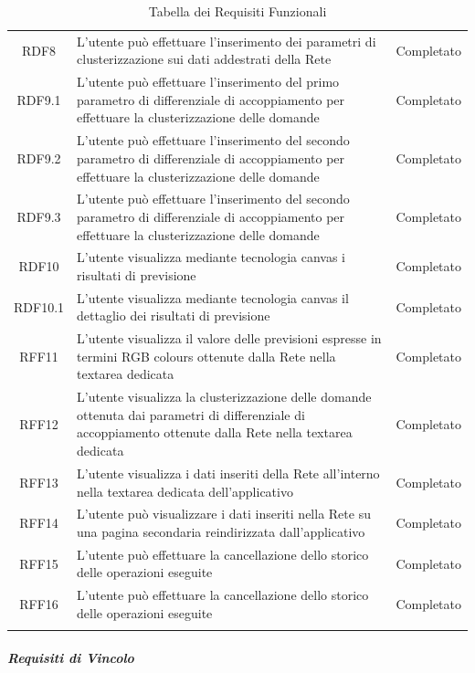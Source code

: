 \begin{longtable}{|c|p{7cm}|c|}
    RDF8 & L'utente pu\`o effettuare l'inserimento dei parametri di clusterizzazione sui dati addestrati della Rete & Completato \\
    RDF9.1 & L'utente pu\`o effettuare l'inserimento del primo parametro di differenziale di accoppiamento per effettuare la clusterizzazione delle domande  & Completato \\
   RDF9.2 & L'utente pu\`o effettuare l'inserimento del secondo parametro di differenziale di accoppiamento per effettuare la clusterizzazione delle domande  & Completato \\
		RDF9.3 & L'utente pu\`o effettuare l'inserimento del secondo parametro di differenziale di accoppiamento per effettuare la clusterizzazione delle domande  & Completato \\
    \hline 
    RDF10 & L'utente visualizza mediante tecnologia canvas i risultati di previsione & Completato \\
    RDF10.1 & L'utente visualizza mediante tecnologia canvas il dettaglio dei risultati di previsione & Completato \\
    \hline
    RFF11 & L'utente visualizza il valore delle previsioni espresse in termini RGB colours ottenute dalla Rete nella textarea dedicata & Completato \\
    \hline
    RFF12 & L'utente visualizza la clusterizzazione delle domande ottenuta dai parametri di differenziale di accoppiamento ottenute dalla Rete nella textarea dedicata & Completato \\
    \hline 
     RFF13 & L'utente visualizza i dati inseriti della Rete all'interno nella textarea dedicata dell'applicativo & Completato \\
	   RFF14 & L'utente pu\`o visualizzare i dati inseriti nella Rete  su una pagina secondaria reindirizzata dall'applicativo & Completato \\
	   \hline
	  RFF15 & L'utente pu\`o effettuare la cancellazione dello storico delle operazioni eseguite & Completato \\
    \hline
    RFF16 & L'utente pu\`o effettuare la cancellazione dello storico delle operazioni eseguite & Completato \\
    \hline 
    
\caption{Tabella dei Requisiti Funzionali}\label{tab:requisiti funzionali funzionali}
\end{longtable}


\subparagraph{Requisiti di Vincolo}\mbox{}
\label{Requisiti di Vincolo}

